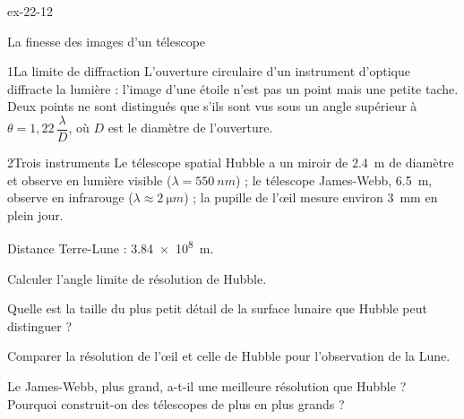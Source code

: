 \begin{blocLivre}{ex-22-12}
\begin{exercice}[3]{La finesse des images d'un télescope}
\begin{docu}{1}{La limite de diffraction}
L'ouverture circulaire d'un instrument d'optique diffracte la lumière : l'image d'une étoile n'est pas un point mais une
petite tache. Deux points ne sont distingués que s'ils sont vus sous un angle supérieur à $\theta=1{,}22\,\dfrac{\lambda}{D}$,
où $D$ est le diamètre de l'ouverture.
\end{docu}
\begin{docu}{2}{Trois instruments}
Le télescope spatial Hubble a un miroir de \qty{2,4}{m} de diamètre et observe en lumière visible
($\lambda=\qty{550}{nm}$) ; le télescope James-Webb, \qty{6,5}{m}, observe en infrarouge ($\lambda\approx\qty{2}{\micro m}$) ; la pupille
de l'œil mesure environ \qty{3}{mm} en plein jour.
\end{docu}
\begin{donnees}
Distance Terre-Lune : \qty{3,84e8}{m}.
\end{donnees}
\begin{questions}
\item Calculer l'angle limite de résolution de Hubble.
\item Quelle est la taille du plus petit détail de la surface lunaire que Hubble peut distinguer ?
\item \initiative Comparer la résolution de l'œil et celle de Hubble pour l'observation de la Lune.
\item Le James-Webb, plus grand, a-t-il une meilleure résolution que Hubble ? Pourquoi construit-on des télescopes de
plus en plus grands ?
\end{questions}
\end{exercice}
\end{blocLivre}
